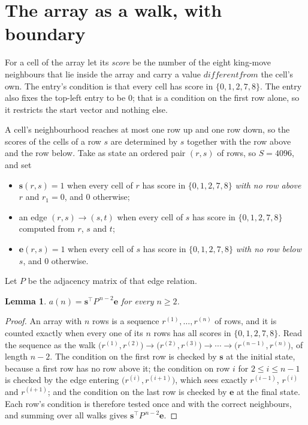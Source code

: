 \documentclass[11pt,a4paper]{article}
\theoremstyle{plain}
\newtheorem{lemma}[theorem]{Lemma}
\theoremstyle{definition}
\begin{document}
\section{The array as a walk, with boundary}

For a cell of the array let its \emph{score} be the number of the eight king-move neighbours that lie inside
the array and carry a value $different from$ the cell's own. The entry's condition is that every cell
has score in $\{0,1,2,7,8\}$. The entry also fixes the top-left entry to be $0$; that is a condition on the first row alone, so it restricts the start vector and nothing else.

A cell's neighbourhood reaches at most one row up and one row down, so the scores of the
cells of a row $s$ are determined by $s$ together with the row above and the row below.
Take as state an ordered pair $(r,s)$ of rows, so $S=4096$, and set
\begin{itemize}
\item $\mathbf{s}(r,s)=1$ when every cell of $r$ has score in $\{0,1,2,7,8\}$ \emph{with no row
above $r$} and $r_1=0$, and $0$ otherwise;
\item an edge $(r,s)\to(s,t)$ when every cell of $s$ has score in $\{0,1,2,7,8\}$ computed from
$r$, $s$ and $t$;
\item $\mathbf{e}(r,s)=1$ when every cell of $s$ has score in $\{0,1,2,7,8\}$ \emph{with no row
below $s$}, and $0$ otherwise.
\end{itemize}
Let $P$ be the adjacency matrix of that edge relation.

\begin{lemma}\label{lem:walk}
$a(n)=\mathbf{s}^{\!\top}P^{\,n-2}\mathbf{e}$ for every $n\ge2$.
\end{lemma}

\begin{proof}
An array with $n$ rows is a sequence $r^{(1)},\dots,r^{(n)}$ of rows, and it is counted
exactly when every one of its $n$ rows has all scores in $\{0,1,2,7,8\}$. Read the sequence as the
walk $\bigl(r^{(1)},r^{(2)}\bigr)\to\bigl(r^{(2)},r^{(3)}\bigr)\to\cdots\to
\bigl(r^{(n-1)},r^{(n)}\bigr)$, of length $n-2$. The condition on the first row is
checked by $\mathbf{s}$ at the initial state, because a first row has no row above it; the
condition on row $i$ for $2\le i\le n-1$ is checked by the edge entering
$\bigl(r^{(i)},r^{(i+1)}\bigr)$, which sees exactly $r^{(i-1)}$, $r^{(i)}$ and
$r^{(i+1)}$; and the condition on the last row is checked by $\mathbf{e}$ at the final
state. Each row's condition is therefore tested once and with the correct neighbours, and
summing over all walks gives $\mathbf{s}^{\!\top}P^{\,n-2}\mathbf{e}$.
\end{proof}
\end{document}
